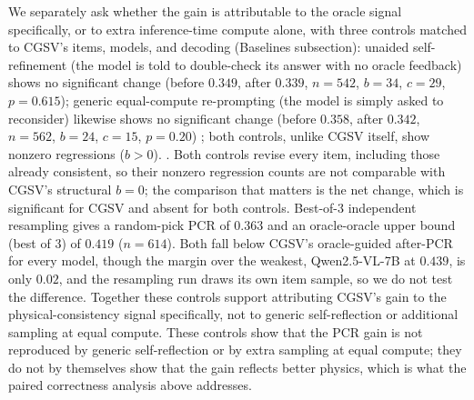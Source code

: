 \documentclass[pdflatex,sn-nature]{sn-jnl}
\newcommand{\rev}[1]{#1} %
\newcommand{\rev}[1]{{\color{blue}#1}} %
\providecommand{\DIFadd}[1]{{\protect\color{blue} \sf #1}} %
\providecommand{\DIFdel}[1]{{\protect\color{red} \scriptsize #1}} %
\providecommand{\DIFaddbegin}{} %
\providecommand{\DIFaddend}{} %
\providecommand{\DIFdelbegin}{} %
\providecommand{\DIFdelend}{} %
\providecommand{\DIFscaledelfig}{0.5}
\newlength{\DIFdelgraphicswidth} %
\newlength{\DIFdelgraphicsheight} %
\providecommand{\DIFaddincludegraphics}[2][]{{\color{blue}\fbox{\DIFOincludegraphics[#1]{#2}}}} %
\providecommand{\DIFdelincludegraphics}[2][]{%
\sbox{\DIFdelgraphicsbox}{\DIFOincludegraphics[#1]{#2}}%
\settoboxwidth{\DIFdelgraphicswidth}{\DIFdelgraphicsbox} %
\settoboxtotalheight{\DIFdelgraphicsheight}{\DIFdelgraphicsbox} %
\scalebox{\DIFscaledelfig}{%
\parbox[b]{\DIFdelgraphicswidth}{\usebox{\DIFdelgraphicsbox}\\[-\baselineskip] \rule{\DIFdelgraphicswidth}{0em}}\llap{\resizebox{\DIFdelgraphicswidth}{\DIFdelgraphicsheight}{%
\setlength{\unitlength}{\DIFdelgraphicswidth}%
\begin{picture}(1,1)%
\thicklines\linethickness{2pt} %
{\color[rgb]{1,0,0}\put(0,0){\framebox(1,1){}}}%
{\color[rgb]{1,0,0}\put(0,0){\line( 1,1){1}}}%
{\color[rgb]{1,0,0}\put(0,1){\line(1,-1){1}}}%
\end{picture}%
}\hspace*{3pt}}} %
} %
\DeclareRobustCommand{\DIFaddbegin}{\DIFOaddbegin \let\includegraphics\DIFaddincludegraphics} %
\DeclareRobustCommand{\DIFaddend}{\DIFOaddend \let\includegraphics\DIFOincludegraphics} %
\DeclareRobustCommand{\DIFdelbegin}{\DIFOdelbegin \let\includegraphics\DIFdelincludegraphics} %
\DeclareRobustCommand{\DIFdelend}{\DIFOaddend \let\includegraphics\DIFOincludegraphics} %
\begin{document}
\DIFadd{\rev{We separately ask whether the gain is}
}\DIFaddend attributable to the oracle signal specifically, or to extra inference-time compute alone,
with three controls matched to CGSV's items, models, and decoding
(Baselines subsection): unaided self-refinement (the model is told to double-check its
answer with no oracle feedback) shows no significant change (before $0.349$, after $0.339$, $n=542$, $b=34$, $c=29$, $p=0.615$);
generic equal-compute re-prompting (the model is simply asked to reconsider) likewise shows
no significant change (before $0.358$, after $0.342$, $n=562$, $b=24$, $c=15$, $p=0.20$)\DIFdelbegin \DIFdel{; both controls, unlike CGSV
itself, show nonzero regressions ($b>0$). }\DIFdelend \DIFaddbegin \DIFadd{. \rev{Both
controls revise every item, including those already consistent, so their nonzero regression counts
are not comparable with CGSV's structural $b=0$; the comparison that matters is the net change,
which is significant for CGSV and absent for both controls.} }\DIFaddend Best-of-3 independent resampling gives a
random-pick PCR of $0.363$ and an oracle-oracle upper bound (best of 3) of $0.419$
($n=614$). Both fall below CGSV's oracle-guided after-PCR for every model, though the
margin over the weakest, Qwen2.5-VL-7B at $0.439$, is only $0.02$, and the resampling run
draws its own item sample, so we do not test the difference. \DIFdelbegin \DIFdel{Together these
controls support attributing CGSV's gain to the physical-consistency signal specifically,
not to generic self-reflection or additional sampling at equal compute.
}\DIFdelend \DIFaddbegin \DIFadd{\rev{These controls show that the PCR gain
is not reproduced by generic self-reflection or by extra sampling at equal compute; they do not
by themselves show that the gain reflects better physics, which is what the paired correctness
analysis above addresses.}
}\DIFaddend 
\end{document}
